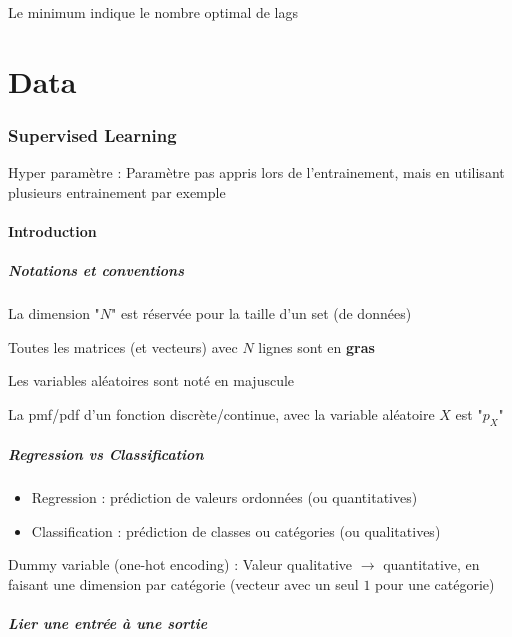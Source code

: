 \documentclass[12pt,a4paper]{article}
\begin{document}
Le minimum indique le nombre optimal de lags


\break
{}              %
\part*{Data}                  %

\section{Supervised Learning}

Hyper paramètre : Paramètre pas appris lors de l'entrainement, mais en utilisant plusieurs entrainement par exemple

\subsection{Introduction}

\subsubsection{Notations et conventions}

La dimension "$N$" est réservée pour la taille d'un set (de données)

Toutes les matrices (et vecteurs) avec $N$ lignes sont en \textbf{gras}

Les variables aléatoires sont noté en majuscule

La pmf/pdf d'un fonction discrète/continue, avec la variable aléatoire $X$ est "$p_X$"


\subsubsection{Regression vs Classification}

\begin{itemize}
    \item Regression : prédiction de valeurs ordonnées (ou quantitatives)
    \item Classification : prédiction de classes ou catégories (ou qualitatives)
\end{itemize}

Dummy variable (one-hot encoding) : Valeur qualitative $\rightarrow$ quantitative, en faisant une dimension par catégorie (vecteur avec un seul $1$ pour une catégorie)

\subsubsection{Lier une entrée à une sortie}
\end{document}
